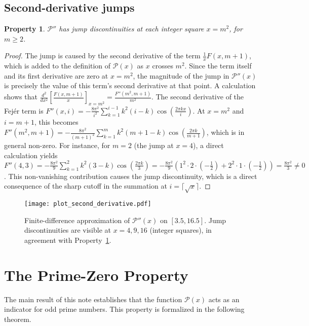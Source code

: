 \documentclass[11pt,a4paper]{amsart}
\newcommand{\Px}{\mathcal{P}}
\theoremstyle{plain}
\newtheorem{property}[theorem]{Property}
\theoremstyle{definition}
\begin{document}
\subsection{Second-derivative jumps}
\begin{property}\label{prop:second}
$\Px''$ has jump discontinuities at each integer square $x=m^2$, for $m\ge2$.
\end{property}
\begin{proof}
The jump is caused by the second derivative of the term $\frac{1}{x}F(x, m+1)$, which is added to the definition of $\Px(x)$ as $x$ crosses $m^2$. Since the term itself and its first derivative are zero at $x=m^2$, the magnitude of the jump in $\Px''(x)$ is precisely the value of this term's second derivative at that point.
A calculation shows that $\frac{d^2}{dx^2}\left[\frac{F(x,m+1)}{x}\right]_{x=m^2} = \frac{F''(m^2, m+1)}{m^2}$. The second derivative of the Fejér term is $F''(x, i) = -\frac{8\pi^2}{i^2}\sum_{k=1}^{i-1}k^2(i-k)\cos\left(\frac{2\pi k x}{i}\right)$.
At $x=m^2$ and $i=m+1$, this becomes $F''(m^2, m+1) = -\frac{8\pi^2}{(m+1)^2}\sum_{k=1}^{m}k^2(m+1-k)\cos\left(\frac{2\pi k}{m+1}\right)$, which is in general non-zero.
For instance, for $m=2$ (the jump at $x=4$), a direct calculation yields $F''(4, 3) = -\frac{8\pi^2}{9} \sum_{k=1}^{2}k^2(3-k)\cos\left(\frac{2\pi k}{3}\right) = -\frac{8\pi^2}{9}(1^2\cdot 2 \cdot (-\frac{1}{2}) + 2^2\cdot 1 \cdot (-\frac{1}{2})) = \frac{8\pi^2}{3} \neq 0$.
This non-vanishing contribution causes the jump discontinuity, which is a direct consequence of the sharp cutoff in the summation at $i = \lceil\sqrt{x}\rceil$.
\end{proof}

\begin{figure}[!htbp]
\centering
\texttt{[image: plot\_second\_derivative.pdf]}
\caption{Finite-difference approximation of $\Px''(x)$ on $[3.5,16.5]$. Jump discontinuities are visible at $x=4,9,16$ (integer squares), in agreement with Property~\ref{prop:second}.}
\label{fig:secondderivative}
\end{figure}

\section{The Prime-Zero Property}

The main result of this note establishes that the function $\Px(x)$ acts as an indicator for odd prime numbers. This property is formalized in the following theorem.
\end{document}
